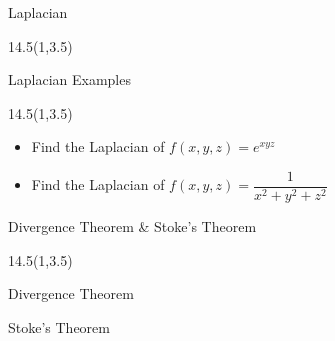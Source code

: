 
\begin{frame}{Laplacian}
\begin{textblock}{14.5}(1,3.5)

\end{textblock}

\end{frame}



\begin{frame}{Laplacian Examples}
\begin{textblock}{14.5}(1,3.5)

\begin{itemize}
	\def\itemsep{18pt}
	\item Find the Laplacian of $f(x,y,z) = e^{xyz}$
	
	\item Find the Laplacian of $f(x,y,z) = \dfrac{1}{x^2 + y^2 + z^2}$
\end{itemize}

\end{textblock}

\end{frame}


\begin{frame}{Divergence Theorem \& Stoke's Theorem}
\begin{textblock}{14.5}(1,3.5)

\begin{myblock}[0.9]{Divergence Theorem}
\end{myblock}


\begin{myblock}[0.9]{Stoke's Theorem}

\center{}

\end{myblock}


\end{textblock}

\end{frame}


